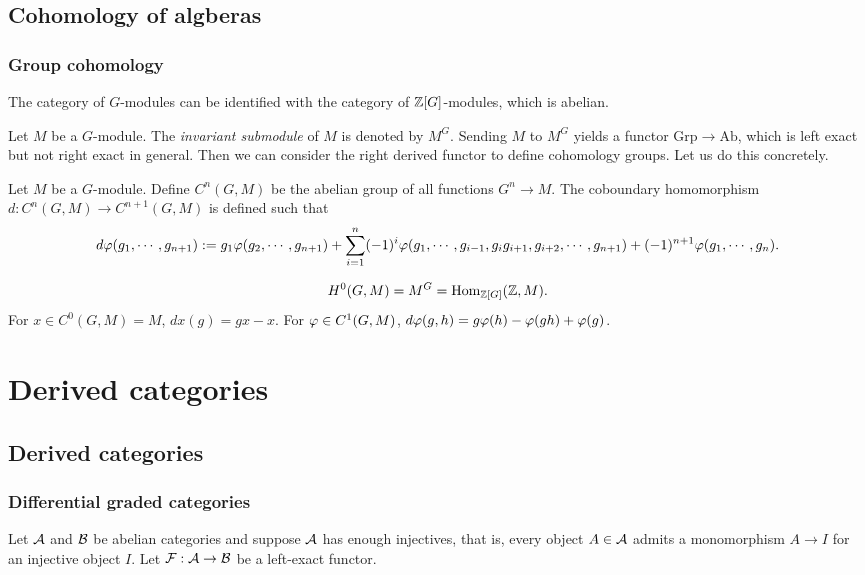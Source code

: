 \documentclass{../../large}
\begin{document}
\chapter{Cohomology of algberas}

\section{Group cohomology}

The category of $G$-modules can be identified with the category of $\mathbb{Z}[G]$-modules, which is abelian.


Let $M$ be a $G$-module.
The \emph{invariant submodule} of $M$ is denoted by $M^G$.
Sending $M$ to $M^G$ yields a functor $\mathrm{Grp}\to\mathrm{Ab}$, which is left exact but not right exact in general.
Then we can consider the right derived functor to define cohomology groups.
Let us do this concretely.


Let $M$ be a $G$-module.
Define $C^n(G,M)$ be the abelian group of all functions $G^n\to M$.
The coboundary homomorphism $d:C^n(G,M)\to C^{n+1}(G,M)$ is defined such that
\[d\varphi(g_1,\cdots,g_{n+1}):=g_1\varphi(g_2,\cdots,g_{n+1})+\sum_{i=1}^n(-1)^i\varphi(g_1,\cdots,g_{i-1},g_ig_{i+1},g_{i+2},\cdots,g_{n+1})+(-1)^{n+1}\varphi(g_1,\cdots,g_n).\]

\[H^0(G,M)=M^G=\operatorname{Hom}_{\mathbb{Z}[G]}(\mathbb{Z},M).\]
For $x\in C^0(G,M)=M$, $dx(g)=gx-x$.
For $\varphi\in C^1(G,M)$, $d\varphi(g,h)=g\varphi(h)-\varphi(gh)+\varphi(g)$.



\part{Derived categories}

\chapter{Derived categories}

\section{Differential graded categories}



\begin{prb}
Let $\mathcal{A}$ and $\mathcal{B}$ be abelian categories and suppose $\mathcal{A}$ has enough injectives, that is, every object $A\in\mathcal{A}$ admits a monomorphism $A\to I$ for an injective object $I$.
Let $\mathcal{F}:\mathcal{A}\to\mathcal{B}$ be a left-exact functor.

\end{prb}
\end{document}
